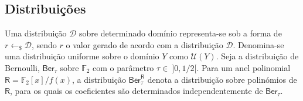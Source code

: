 \subsection{Distribuições}
Uma distribuição $\mathcal{D}$ sobre determinado domínio representa-se sob a forma de $r \longleftarrow_{\$} \mathcal{D}$, sendo $r$ o valor gerado de acordo com a distribuição $\mathcal{D}$. Denomina-se uma distribuição uniforme sobre o domínio $Y$ como $\mathcal{U}(Y)$. Seja a distribuição de \textsf{Bernoulli},  $\textsf{Ber}_{\tau}$ sobre $\mathbb{F}_2$ com o parâmetro $\tau \in\ ]0,1/2[$. Para um anel polinomial $\mathsf{R} = \mathbb{F}_2[x]/f(x)$, a distribuição $\textsf{Ber}_{\tau}^\mathsf{R}$ denota a distribuição sobre polinómios de $\mathsf{R}$, para os quais os coeficientes são determinados independentemente de $\textsf{Ber}_{\tau}$.%
